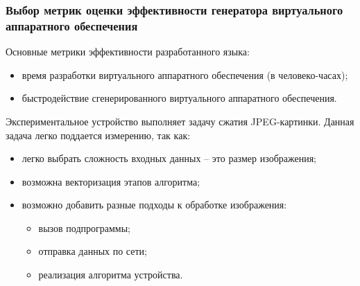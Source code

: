 \begin{frame}%
    \frametitle{Выбор метрик оценки эффективности генератора виртуального аппаратного обеспечения}
    Основные метрики эффективности разработанного языка:
    \begin{itemize}
        \item время разработки виртуального аппаратного обеспечения (в человеко-часах);
        \item быстродействие сгенерированного виртуального аппаратного обеспечения.
    \end{itemize}


    Экспериментальное устройство выполняет задачу сжатия JPEG-картинки.
    Данная задача легко поддается измерению, так как:
    \begin{itemize}
        \item легко выбрать сложность входных данных -- это
            размер изображения;
        \item возможна векторизация этапов алгоритма;
        \item возможно добавить разные подходы к обработке
            изображения:
            \begin{itemize}
                \item вызов подпрограммы;
                \item отправка данных по сети;
                \item реализация алгоритма устройства.
            \end{itemize}
    \end{itemize}
\end{frame}


